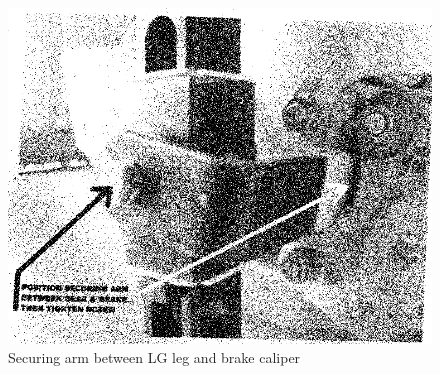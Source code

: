 \begin{figure}
[htb]
\begin{center}
\includegraphics[scale=1]{../Diagrams/Jack_Instructions_2}
\end{center}
\caption{Securing arm between LG leg and brake caliper}
\end{figure}

\clearpage

